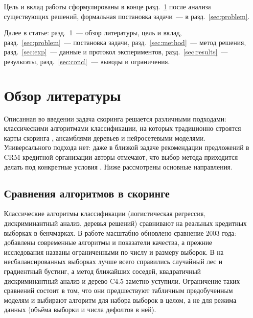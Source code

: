 \documentclass{misisarticle}
\begin{document}
Цель и вклад работы сформулированы в конце разд.~\ref{sec:related} после анализа существующих решений, формальная постановка задачи~--- в разд.~\ref{sec:problem}.

Далее в статье: разд.~\ref{sec:related}~--- обзор литературы, цель и вклад, разд.~\ref{sec:problem}~--- постановка задачи, разд.~\ref{sec:method}~--- метод решения, разд.~\ref{sec:exp}~--- данные и протокол экспериментов, разд.~\ref{sec:results}~--- результаты, разд.~\ref{sec:concl}~--- выводы и ограничения.

\section{Обзор литературы}
\label{sec:related}

Описанная во введении задача скоринга решается различными подходами: классическими алгоритмами классификации, на которых традиционно строятся карты скоринга \cite{lessmann2015}, ансамблями деревьев и нейросетевыми моделями. Универсального подхода нет: даже в близкой задаче рекомендации предложений в CRM кредитной организации авторы отмечают, что выбор метода приходится делать под конкретные условия \cite{kovalev2024}. Ниже рассмотрены основные направления.

\subsection{Сравнения алгоритмов в скоринге}

Классические алгоритмы классификации (логистическая регрессия, дискриминантный анализ, деревья решений) сравнивают на реальных кредитных выборках в бенчмарках. В работе \cite{lessmann2015} масштабно обновлено сравнение 2003 года: добавлены современные алгоритмы и показатели качества, а прежние исследования названы ограниченными по числу и размеру выборок. В \cite{brown2012} на несбалансированных выборках лучше всего справились случайный лес и градиентный бустинг, а метод ближайших соседей, квадратичный дискриминантный анализ и дерево C4.5 заметно уступили. Ограничение таких сравнений состоит в том, что они предшествуют табличным предобученным моделям и выбирают алгоритм для набора выборок в целом, а не для режима данных (объёма выборки и числа дефолтов в ней).
\end{document}
